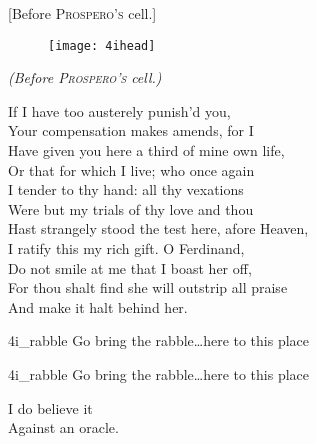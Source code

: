 
[Before \textsc{Prospero's} cell.]

\begin{figure}[t]
	\centering
	\texttt{[image: 4ihead]}
\end{figure}

\vspace{\textsink}

\textit{(Before \textsc{Prospero's} cell.)}\centering



\begin{verse_speech}[Prospero] 
If I have too austerely punish'd you,\\
Your compensation makes amends, for I\\
Have given you here a third of mine own life,\\
Or that for which I live; who once again\\
I tender to thy hand: all thy vexations\\
Were but my trials of thy love and thou\\
Hast strangely stood the test here, afore Heaven,\\
I ratify this my rich gift. O Ferdinand,\\
Do not smile at me that I boast her off,\\
For thou shalt find she will outstrip all praise\\
And make it halt behind her.
\end{verse_speech}

\begin{pictures} %
	\begin{letter}
		\begin{colorbigpic}
			[1.1]
			{4i_rabble}
			{Go bring the rabble\dots here to this place}
		\end{colorbigpic}
	\end{letter}
	\begin{a4}
		\begin{colorbigpic}
			[1]
			{4i_rabble}
			{Go bring the rabble\dots here to this place}
		\end{colorbigpic}
	\end{a4}
\end{pictures}


\begin{verse_speech}[Ferdinand] 
I do believe it\\
Against an oracle.
\end{verse_speech}

